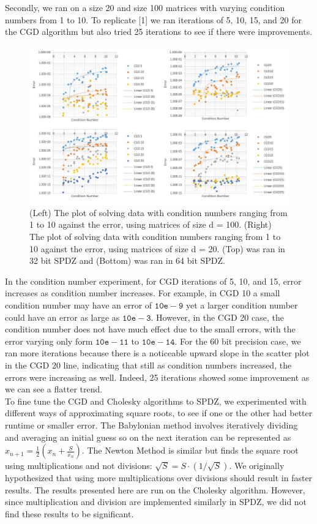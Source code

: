 \documentclass{article}
\theoremstyle{plain}
\theoremstyle{definition}
\theoremstyle{remark}
\begin{document}
\noindent
Secondly, we ran on a size 20 and size 100 matrices with varying condition numbers from 1 to 10. To replicate [1] we ran iterations of 5, 10, 15, and 20 for the CGD algorithm but also tried 25 iterations to see if there were improvements. 
\begin{figure}[H]
\centering
  \includegraphics[scale=0.6]{conditionnumber.jpg}
  \caption{(Left) The plot of solving data with condition numbers ranging from 1 to 10 against the error, using matrices of size d = 100. (Right) The plot of solving data with condition numbers ranging from 1 to 10 against the error, using matrices of size d = 20. (Top) was ran in 32 bit SPDZ and (Bottom) was ran in 64 bit SPDZ.}
  \label{fig:result3}
\end{figure}

\noindent
In the condition number experiment, for CGD iterations of 5, 10, and 15, error increases as condition number increases. For example, in CGD 10 a small condition number may have an error of $\mathtt{10e-9}$ yet a larger condition number could have an error as large as $\mathtt{10e-3}$. However, in the CGD 20 case, the condition number does not have much effect due to the small errors, with the error varying only form $\mathtt{10e-11}$ to $\mathtt{10e-14}$. For the 60 bit precision case, we ran more iterations because there is a noticeable upward slope in the scatter plot in the CGD 20 line, indicating that still as condition numbers increased, the errors were increasing as well. Indeed, 25 iterations showed some improvement as we can see a flatter trend.\\

\noindent
To fine tune the CGD and Cholesky algorithms to SPDZ, we experimented with different ways of approximating square roots, to see if one or the other had better runtime or smaller error. The Babylonian method involves iteratively dividing and averaging an initial guess so on the next iteration can be represented as $x_{n+1} = \frac{1}{2} (x_{n} + \frac{S}{x_{n}})$. The Newton Method is similar but finds the square root using multiplications and not divisions: $\sqrt{S} = S \cdot (1/\sqrt{S})$. We originally hypothesized that using more multiplications over divisions should result in faster results. The results presented here are run on the Cholesky algorithm. However, since multiplication and division are implemented similarly in SPDZ, we did not find these results to be significant.
\end{document}
